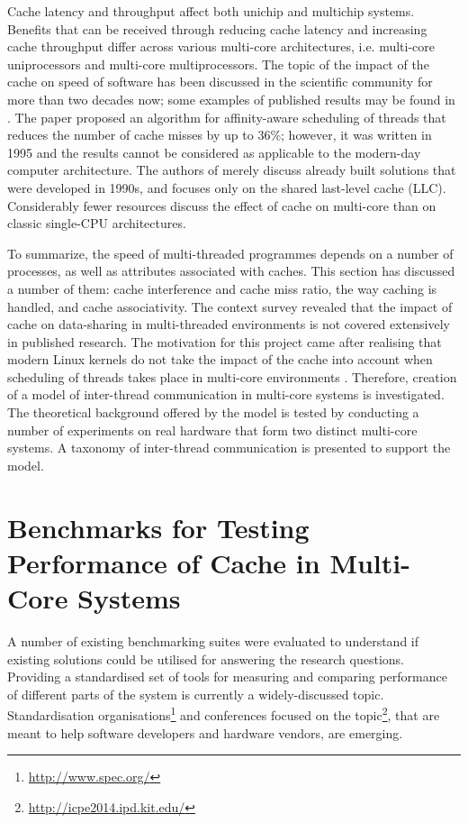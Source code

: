 Cache latency and throughput affect both unichip and multichip systems. Benefits that can be received through reducing cache latency and increasing cache throughput differ across various multi-core architectures, i.e. multi-core uniprocessors and multi-core multiprocessors. The topic of the impact of the cache on speed of software has been discussed in the scientific community for more than two decades now; some examples of published results may be found in \cite{torrellas1995evaluating, Chen2007,VineethMekkatAnupHoleyPen-ChungYew2013}. The paper \cite{torrellas1995evaluating} proposed an algorithm for affinity-aware scheduling of threads that reduces the number of cache misses by up to 36\%; however, it was written in 1995 and the results cannot be considered as applicable to the modern-day computer architecture. The authors of \cite{Chen2007} merely discuss already built solutions that were developed in 1990s, and \cite{VineethMekkatAnupHoleyPen-ChungYew2013} focuses only on the shared last-level cache (LLC). Considerably fewer resources discuss the effect of cache on multi-core than on classic single-CPU architectures.

To summarize, the speed of multi-threaded programmes depends on a number of processes, as well as attributes associated with caches. This section has discussed a number of them: cache interference and cache miss ratio, the way caching is handled, and cache associativity. The context survey revealed that the impact of cache on data-sharing in multi-threaded environments is not covered extensively in published research. The motivation for this project came after realising that modern Linux kernels do not take the impact of the cache into account when scheduling of threads takes place in multi-core environments \cite{Bovet:2005:ULK:1077084,Aas2005}. Therefore, creation of a model of inter-thread communication in multi-core systems is investigated. The theoretical background offered by the model is tested by conducting a number of experiments on real hardware that form two distinct multi-core systems. A taxonomy of inter-thread communication is presented to support the model.

\section{Benchmarks for Testing Performance of Cache in Multi-Core Systems}
\label{sec:benchmarks}

A number of existing benchmarking suites were evaluated to understand if existing solutions could be utilised for answering the research questions. Providing a standardised set of tools for measuring and comparing performance of different parts of the system is currently a widely-discussed topic. Standardisation organisations\footnote{\url{http://www.spec.org/}} and conferences focused on the topic\footnote{\url{http://icpe2014.ipd.kit.edu/}}, that are meant to help software developers and hardware vendors, are emerging.

